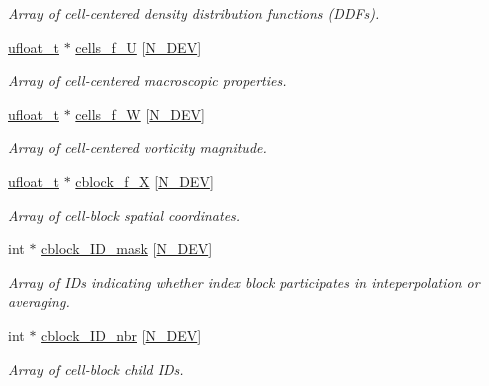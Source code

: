 \begin{DoxyCompactItemize}
\begin{DoxyCompactList}\small\item\em Array of cell-\/centered density distribution functions (D\+D\+Fs). \end{DoxyCompactList}\item 
\hyperlink{cppspec_8h_af529d360dfac9b9578aa719418a53a21}{ufloat\+\_\+t} $\ast$ \hyperlink{classMesh_a242518ffb09784e8a6c6ebb13c4ec039}{cells\+\_\+f\+\_\+U} \mbox{[}\hyperlink{cppspec_8h_a2b674dab7a14f1bf32b48b7fda5022dc}{N\+\_\+\+D\+EV}\mbox{]}
\begin{DoxyCompactList}\small\item\em Array of cell-\/centered macroscopic properties. \end{DoxyCompactList}\item 
\hyperlink{cppspec_8h_af529d360dfac9b9578aa719418a53a21}{ufloat\+\_\+t} $\ast$ \hyperlink{classMesh_a6b9285bbb403bd26c6e3a7fe6c93c593}{cells\+\_\+f\+\_\+W} \mbox{[}\hyperlink{cppspec_8h_a2b674dab7a14f1bf32b48b7fda5022dc}{N\+\_\+\+D\+EV}\mbox{]}
\begin{DoxyCompactList}\small\item\em Array of cell-\/centered vorticity magnitude. \end{DoxyCompactList}\item 
\hyperlink{cppspec_8h_af529d360dfac9b9578aa719418a53a21}{ufloat\+\_\+t} $\ast$ \hyperlink{classMesh_a6f0e622a1e6706f4c7ef3b86474fd654}{cblock\+\_\+f\+\_\+X} \mbox{[}\hyperlink{cppspec_8h_a2b674dab7a14f1bf32b48b7fda5022dc}{N\+\_\+\+D\+EV}\mbox{]}
\begin{DoxyCompactList}\small\item\em Array of cell-\/block spatial coordinates. \end{DoxyCompactList}\item 
int $\ast$ \hyperlink{classMesh_ac9cda8833eb008b6a99988e18fd09960}{cblock\+\_\+\+I\+D\+\_\+mask} \mbox{[}\hyperlink{cppspec_8h_a2b674dab7a14f1bf32b48b7fda5022dc}{N\+\_\+\+D\+EV}\mbox{]}
\begin{DoxyCompactList}\small\item\em Array of I\+Ds indicating whether index block participates in inteperpolation or averaging. \end{DoxyCompactList}\item 
int $\ast$ \hyperlink{classMesh_a81d8e99aa31cb83a0f58805ef1f5ca86}{cblock\+\_\+\+I\+D\+\_\+nbr} \mbox{[}\hyperlink{cppspec_8h_a2b674dab7a14f1bf32b48b7fda5022dc}{N\+\_\+\+D\+EV}\mbox{]}
\begin{DoxyCompactList}\small\item\em Array of cell-\/block child I\+Ds. \end{DoxyCompactList}\item 

\end{DoxyCompactItemize}
